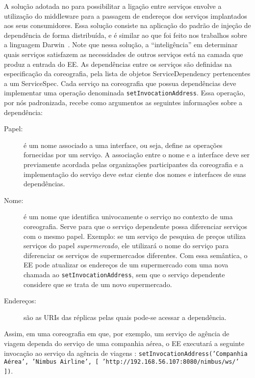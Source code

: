 A solução adotada no \ee para possibilitar a ligação entre serviços envolve a utilização do middleware para a passagem de endereços dos serviços implantados aos seus consumidores. Essa solução consiste na aplicação do padrão de injeção de dependência de forma distribuída, e é similar ao que foi feito nos trabalhos sobre a linguagem Darwin~\cite{Magee1996Dynamic, Magee1994Regis}. 
Note que nessa solução, a ``inteligência'' em determinar quais serviços satisfazem as necessidades de outros serviços está na camada que produz a entrada do EE.
As dependências entre os serviços são definidas na especificação da coreografia,
pela lista de objetos \textsf{ServiceDependency} pertencentes a um \textsf{ServiceSpec}.
Cada serviço na coreografia que possua dependências deve implementar uma operação denominada \texttt{setInvocationAddress}. 
Essa operação, por nós padronizada, recebe como argumentos as seguintes informações sobre a dependência: 

\begin{description}

\item [Papel:] é um nome associado a uma interface, ou seja, define as operações fornecidas por um serviço. A associação entre o nome e 
a interface deve ser previamente acordada pelas organizações participantes da coreografia e a implementação do serviço
deve estar ciente dos nomes e interfaces de suas dependências.

\item [Nome:] é um nome que identifica univocamente o serviço no contexto de uma coreografia. Serve para que o serviço dependente possa 
diferenciar serviços com o mesmo papel. Exemplo: se um serviço de pesquisa de preços utiliza serviços do papel \emph{supermercado},
ele utilizará o nome do serviço para diferenciar os serviços de supermercados diferentes. Com essa semântica, o EE pode atualizar
os endereços de um supermercado com uma nova chamada ao \texttt{setInvocationAddress}, sem que o serviço dependente considere
que se trata de um novo supermercado.

\item [Endereços:] são as URIs das réplicas pelas quais pode-se acessar a dependência.

\end{description}

Assim, em uma coreografia em que, por exemplo, um serviço de agência de viagem dependa do serviço de uma companhia aérea, o EE executará a seguinte invocação ao serviço da agência de viagens : \texttt{setInvocationAddress('Companhia Aérea', 'Nimbus Airline', [ 'http://192.168.56.107:8080/nimbus/ws/' ])}. 


